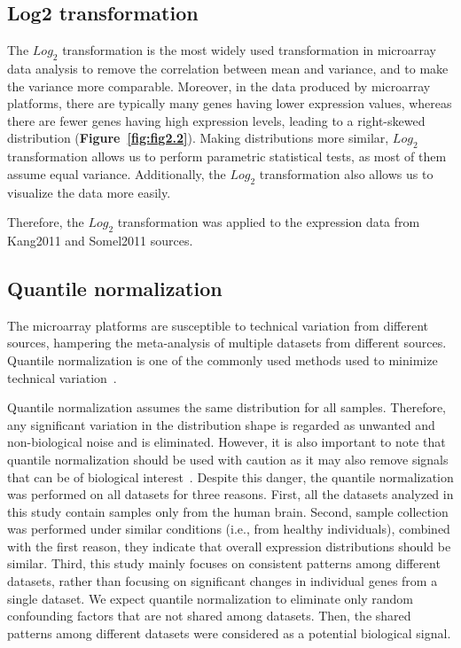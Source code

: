 \subsection{Log2 transformation}

The $Log_2$ transformation is the most widely used transformation in microarray data analysis
to remove the correlation between mean and variance, and to make the variance more comparable.
Moreover, in the data produced by microarray platforms, there are typically many genes having lower expression values, 
whereas there are fewer genes having high expression levels,
leading to a right-skewed distribution (\textbf{Figure~\ref{fig:fig2.2}}).
Making distributions more similar, $Log_2$ transformation allows us to perform parametric statistical tests, as most of them assume equal variance. 
Additionally, the $Log_2$ transformation also allows us to visualize the data more easily.

Therefore, the $Log_2$ transformation was applied to the expression data from Kang2011 and Somel2011 sources.

\subsection{Quantile normalization}
The microarray platforms are susceptible to technical variation from different sources, hampering the meta-analysis of multiple datasets from different sources.
Quantile normalization is one of the commonly used methods used to minimize technical variation~\cite{Zhao2020}. 

Quantile normalization assumes the same distribution for all samples. 
Therefore, any significant variation in the distribution shape is regarded as unwanted and non-biological noise and is eliminated.
However, it is also important to note that quantile normalization should be used with caution as it may also remove signals that can be of biological interest~\cite{Hicks2014}.
Despite this danger, the quantile normalization was performed on all datasets for three reasons. 
First, all the datasets analyzed in this study contain samples only from the human brain.
Second, sample collection was performed under similar conditions (i.e., from healthy individuals), combined with the first reason, they indicate that overall expression distributions should be similar.
Third, this study mainly focuses on consistent patterns among different datasets, rather than focusing on significant changes in individual genes from a single dataset.
We expect quantile normalization to eliminate only random confounding factors that are not shared among datasets. 
Then, the shared patterns among different datasets were considered as a potential biological signal.

